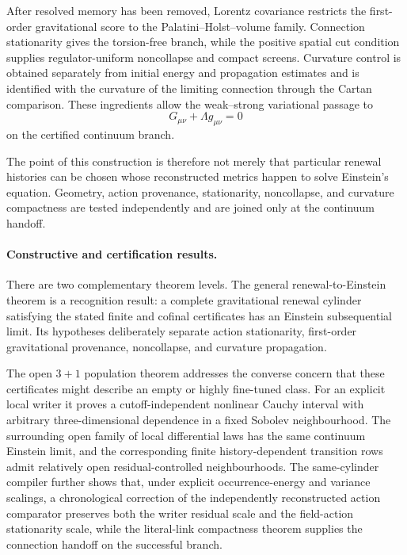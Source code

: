 \documentclass[11pt]{article}
\numberwithin{equation}{section}
\theoremstyle{definition}
\theoremstyle{remark}
\begin{document}
After resolved memory has been removed, Lorentz covariance restricts the
first-order gravitational score to the Palatini--Holst--volume family.
Connection stationarity gives the torsion-free branch, while the positive
spatial cut condition supplies regulator-uniform noncollapse and compact
screens.  Curvature control is obtained separately from initial energy and
propagation estimates and is identified with the curvature of the limiting
connection through the Cartan comparison.  These ingredients allow the
weak--strong variational passage to
\begin{equation}
\boxed{
G_{\mu\nu}+\Lambda g_{\mu\nu}=0
}
\end{equation}
on the certified continuum branch.

The point of this construction is therefore not merely that particular
renewal histories can be chosen whose reconstructed metrics happen to solve
Einstein's equation.  Geometry, action provenance, stationarity, noncollapse,
and curvature compactness are tested independently and are joined only at the
continuum handoff.

\paragraph{Constructive and certification results.}

There are two complementary theorem levels.  The general
renewal-to-Einstein theorem is a recognition result: a complete gravitational
renewal cylinder satisfying the stated finite and cofinal certificates has an
Einstein subsequential limit.  Its hypotheses deliberately separate action
stationarity, first-order gravitational provenance, noncollapse, and
curvature propagation.

The open $3+1$ population theorem addresses the converse concern that these
certificates might describe an empty or highly fine-tuned class.  For an
explicit local writer it proves a cutoff-independent nonlinear Cauchy interval
with arbitrary three-dimensional dependence in a fixed Sobolev
neighbourhood.  The surrounding open family of local differential laws has
the same continuum Einstein limit, and the corresponding finite
history-dependent transition rows admit relatively open residual-controlled
neighbourhoods.  The same-cylinder compiler further shows that, under explicit
occurrence-energy and variance scalings, a chronological correction of the
independently reconstructed action comparator preserves both the writer
residual scale and the field-action stationarity scale, while the literal-link
compactness theorem supplies the connection handoff on the successful branch.
\end{document}

